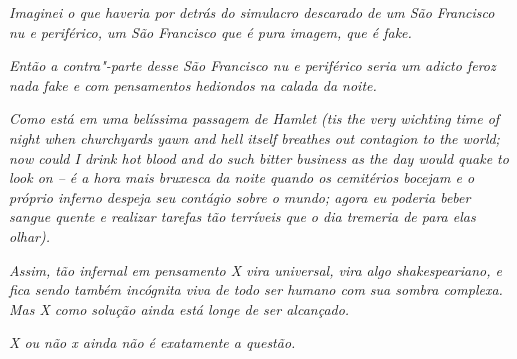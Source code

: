 \emph{Imaginei o que haveria por detrás do simulacro descarado de um São
Francisco nu e periférico, um São Francisco que é pura imagem, que é
fake.}~

\emph{Então a contra"-parte desse São Francisco nu e periférico seria um
adicto feroz nada fake e com pensamentos hediondos na calada da noite.}~

\emph{Como está em uma belíssima passagem de Hamlet (tis the very
wichting time of night when churchyards yawn and hell itself breathes
out contagion to the world; now could I drink hot blood and do such
bitter business as the day would quake to look on -- é a hora mais
bruxesca da noite quando os cemitérios bocejam e o próprio inferno
despeja seu contágio sobre o mundo; agora eu poderia beber sangue quente
e realizar tarefas tão terríveis que o dia tremeria de para elas
olhar).}~

\emph{Assim, tão infernal em pensamento X vira universal, vira algo
shakespeariano, e fica sendo também incógnita viva de todo ser humano
com sua sombra complexa. Mas X como solução ainda está longe de ser
alcançado.}

\emph{X ou não x ainda não é exatamente a questão.~}

